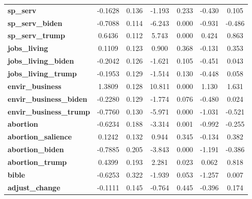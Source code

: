 \begin{center}
\begin{tabular}{lcccccc}
\textbf{sp\_serv}               &      -0.1628  &        0.136     &    -1.193  &         0.233        &       -0.430    &        0.105     \\
\textbf{sp\_serv\_biden}        &      -0.7088  &        0.114     &    -6.243  &         0.000        &       -0.931    &       -0.486     \\
\textbf{sp\_serv\_trump}        &       0.6436  &        0.112     &     5.743  &         0.000        &        0.424    &        0.863     \\
\textbf{jobs\_living}           &       0.1109  &        0.123     &     0.900  &         0.368        &       -0.131    &        0.353     \\
\textbf{jobs\_living\_biden}    &      -0.2042  &        0.126     &    -1.621  &         0.105        &       -0.451    &        0.043     \\
\textbf{jobs\_living\_trump}    &      -0.1953  &        0.129     &    -1.514  &         0.130        &       -0.448    &        0.058     \\
\textbf{envir\_business}        &       1.3809  &        0.128     &    10.811  &         0.000        &        1.130    &        1.631     \\
\textbf{envir\_business\_biden} &      -0.2280  &        0.129     &    -1.774  &         0.076        &       -0.480    &        0.024     \\
\textbf{envir\_business\_trump} &      -0.7760  &        0.130     &    -5.971  &         0.000        &       -1.031    &       -0.521     \\
\textbf{abortion}               &      -0.6234  &        0.188     &    -3.314  &         0.001        &       -0.992    &       -0.255     \\
\textbf{abortion\_salience}     &       0.1242  &        0.132     &     0.944  &         0.345        &       -0.134    &        0.382     \\
\textbf{abortion\_biden}        &      -0.7885  &        0.205     &    -3.843  &         0.000        &       -1.191    &       -0.386     \\
\textbf{abortion\_trump}        &       0.4399  &        0.193     &     2.281  &         0.023        &        0.062    &        0.818     \\
\textbf{bible}                  &      -0.6253  &        0.322     &    -1.939  &         0.053        &       -1.257    &        0.007     \\
\textbf{adjust\_change}         &      -0.1111  &        0.145     &    -0.764  &         0.445        &       -0.396    &        0.174     \\

\end{tabular}
\end{center}
